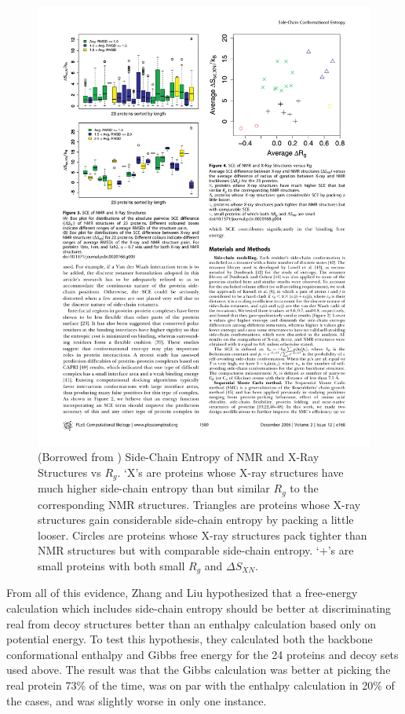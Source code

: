 \begin{figure}[ht]
	\center
	\includegraphics{deltaS_discrimination}
	\caption{(Borrowed from \cite{Zhang:2006p11}) Side-Chain Entropy of NMR and X-Ray Structures vs $R_g$. `X's are proteins whose X-ray structures have much higher side-chain entropy than but similar $R_g$ to the corresponding NMR structures. Triangles are proteins whose X-ray structures gain considerable side-chain entropy by packing a little looser. Circles are proteins whose X-ray structures pack tighter than NMR structures but with comparable side-chain entropy. `+'s are small proteins with both small $R_g$ and $\Delta S_{XN}$.}
	\label{fig:deltaS_discrimination}
\end{figure}

From all of this evidence, Zhang and Liu hypothesized that a free-energy calculation which includes side-chain entropy should be better at discriminating real from decoy structures better than an enthalpy calculation based only on potential energy. To test this hypothesis, they calculated both the backbone conformational enthalpy and Gibbs free energy for the 24 proteins and decoy sets used above. The result was that the Gibbs calculation was better at picking the real protein 73\% of the time, was on par with the enthalpy calculation in 20\% of the cases, and was slightly worse in only one instance.

